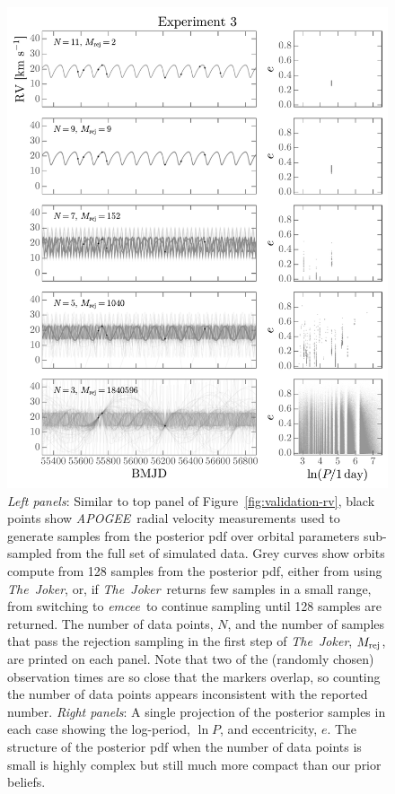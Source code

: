 \documentclass[manuscript, letterpaper]{aastex6}
\newcommand{\project}[1]{\textsl{#1}}
\newcommand{\acronym}[1]{{\small{#1}}}
\newcommand{\apogee}{\project{\acronym{APOGEE}}}
\newcommand{\samplername}{\project{The~Joker}}
\newcommand{\emcee}{\project{emcee}}
\newcommand{\figname}{Figure}
\begin{document}
\begin{figure}[p]
\begin{center}
\includegraphics[width=\textwidth]{figures/numpts-rv-curves.pdf}
\end{center}
\caption{%
{\sl Left panels}: Similar to top panel of \figname~\ref{fig:validation-rv}, black
points show \apogee\ radial velocity measurements used to generate samples from
the posterior pdf over orbital parameters sub-sampled from the full set of
simulated data.
Grey curves show orbits compute from 128 samples from the posterior pdf, either
from using \samplername, or, if \samplername\ returns few samples in a small
range, from switching to \emcee\ to continue sampling until 128 samples are
returned.
The number of data points, $N$, and the number of samples that pass the
rejection sampling in the first step of \samplername, $M_{\rm rej}$, are printed
on each panel.
Note that two of the (randomly chosen) observation times are so close that the
markers overlap, so counting the number of data points appears inconsistent with
the reported number.
{\sl Right panels}: A single projection of the posterior samples in each case
showing the log-period, $\ln P$, and eccentricity, $e$.
The structure of the posterior pdf when the number of data points is small is
highly complex but still much more compact than our prior beliefs.
\label{fig:numpts-rv}}
\end{figure}
\end{document}
